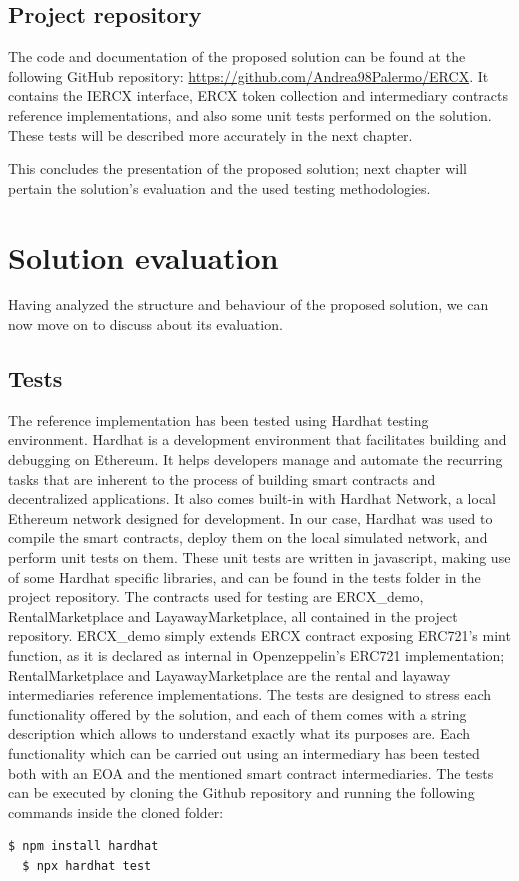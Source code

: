 \documentclass[english, LaM, oneside]{sapthesis}%
\begin{document}
\section{Project repository}
The code and documentation of the proposed solution can be found at the following GitHub repository: \url{https://github.com/Andrea98Palermo/ERCX}. It contains the IERCX interface,  ERCX token collection and intermediary contracts reference implementations, and also some unit tests performed on the solution. These tests will be described more accurately in the next chapter.

\bigskip
\bigskip
This concludes the presentation of the proposed solution; next chapter will pertain the solution's evaluation and the used testing methodologies.


\chapter{Solution evaluation}
\label{chap:3}
Having analyzed the structure and behaviour of the proposed solution, we can now move on to discuss about its evaluation.

\section{Tests}
The reference implementation has been tested using Hardhat\cite{ref:hardhat} testing environment. Hardhat is a development environment that facilitates building and debugging on Ethereum. It helps developers manage and automate the recurring tasks that are inherent to the process of building smart contracts and decentralized applications. It also comes built-in with Hardhat Network, a local Ethereum network designed for development. \newline
In our case, Hardhat was used to compile the smart contracts, deploy them on the local simulated network, and perform unit tests on them. These unit tests are written in javascript, making use of some Hardhat specific libraries, and can be found in the tests folder in the project repository. \newline
The contracts used for testing are ERCX\_demo, RentalMarketplace and LayawayMarketplace, all contained in the project repository. ERCX\_demo simply extends ERCX contract exposing ERC721's mint function, as it is declared as internal in Openzeppelin's ERC721 implementation; RentalMarketplace and LayawayMarketplace are the rental and layaway intermediaries reference implementations.\newline
The tests are designed to stress each functionality offered by the solution, and each of them comes with a string description which allows to understand exactly what its purposes are. Each functionality which can be carried out using an intermediary has been tested both with an EOA and the mentioned smart contract intermediaries. \newline
The tests can be executed by cloning the Github repository and running the following commands inside the cloned folder:
\begin{lstlisting}[language=bash]
  $ npm install hardhat  
  $ npx hardhat test
\end{lstlisting}
\end{document}
